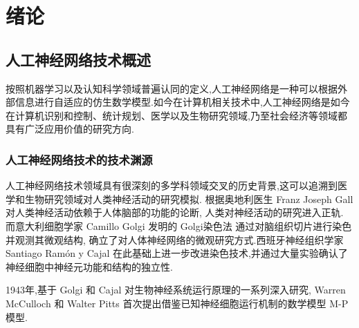 
\chapter{绪论} \label{chpt:A}

\section{人工神经网络技术概述}

按照机器学习以及认知科学领域普遍认同的定义,人工神经网络是一种可以根据外部信息进行自适应的仿生数学模型.如今在计算机相关技术中,人工神经网络是如今在计算机识别和控制、统计规划、医学以及生物研究领域,乃至社会经济等领域都具有广泛应用价值的研究方向.

\subsection{人工神经网络技术的技术渊源}


人工神经网络技术领域具有很深刻的多学科领域交叉的历史背景,这可以追溯到医学和生物研究领域对人类神经活动的研究模拟. 根据奥地利医生 Franz Joseph Gall 对人类神经活动依赖于人体脑部的功能的论断, 人类对神经活动的研究进入正轨. 而意大利细胞学家 Camillo Golgi 发明的 Golgi染色法 通过对脑组织切片进行染色并观测其微观结构, 确立了对人体神经网络的微观研究方式.西班牙神经组织学家 Santiago Ramón y Cajal 在此基础上进一步改进染色技术,并通过大量实验确认了神经细胞中神经元功能和结构的独立性.

1943年,基于 Golgi 和 Cajal 对生物神经系统运行原理的一系列深入研究, Warren McCulloch 和 Walter Pitts 首次提出借鉴已知神经细胞运行机制的数学模型 M-P 模型.

